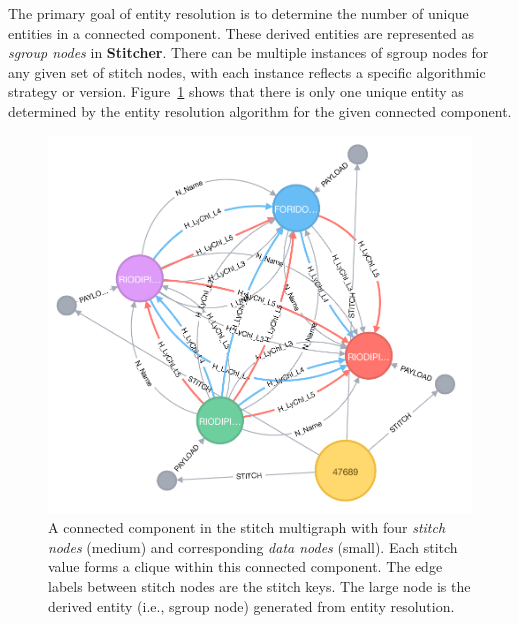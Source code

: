 \documentclass{bioinfo}
\newcommand\st{\textbf{Stitcher}}
\begin{document}
The primary goal of entity resolution is to determine the number of unique entities in a connected component. These derived entities are represented as \emph{sgroup nodes} in \st. There can be multiple instances of sgroup nodes for any given set of stitch nodes, with each instance reflects a specific algorithmic strategy or version. Figure~\ref{fig:graph1} shows that there is only one unique entity as determined by the entity resolution algorithm for the given connected component.

\begin{figure}[!tpb]
\centerline{\includegraphics[scale=0.5]{graph2}}
\caption{A connected component in the stitch multigraph with four \emph{stitch nodes} (medium) and corresponding \emph{data nodes} (small). Each stitch value forms a clique within this connected component. The edge labels between stitch nodes are the stitch keys. The large node is the derived entity (i.e., sgroup node) generated from entity resolution.}\label{fig:graph1}
\end{figure}
\end{document}
